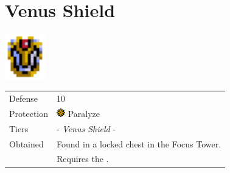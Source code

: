 \section{Venus Shield}
\label{armor:venus_shield}

\includegraphics[height=2cm,keepaspectratio]{./resources/armors/venusshield}

\begin{longtable}{ l p{9cm} }
	Defense
	& 10
\\ %
	Protection
	& \includegraphics[height=1em,keepaspectratio]{./resources/effects/paralyze}
	Paralyze
\\ %
	Tiers
	& \nameref{armor:steel_shield} - \textit{Venus Shield} - \nameref{armor:aegis_shield}
\\ %
	Obtained
	& Found in a locked chest in the Focus Tower. \\
	& Requires the \nameref{item:venus_key}.
\end{longtable}
